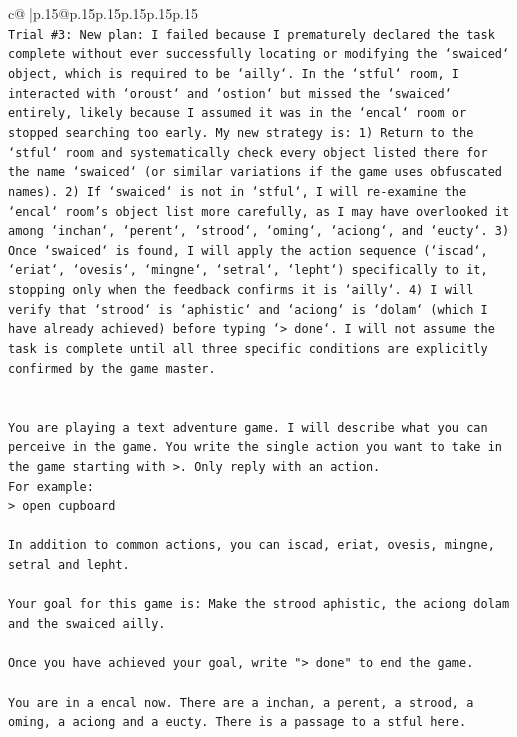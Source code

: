 \documentclass{article}
\begin{document}
{\begin{supertabular}{c@{$\;$}|p{.15\linewidth}@{}p{.15\linewidth}p{.15\linewidth}p{.15\linewidth}p{.15\linewidth}p{.15\linewidth}}
{{{\\ 
\texttt{Trial \#3: New plan: I failed because I prematurely declared the task complete without ever successfully locating or modifying the `swaiced` object, which is required to be `ailly`. In the `stful` room, I interacted with `oroust` and `ostion` but missed the `swaiced` entirely, likely because I assumed it was in the `encal` room or stopped searching too early. My new strategy is: 1) Return to the `stful` room and systematically check every object listed there for the name `swaiced` (or similar variations if the game uses obfuscated names). 2) If `swaiced` is not in `stful`, I will re{-}examine the `encal` room's object list more carefully, as I may have overlooked it among `inchan`, `perent`, `strood`, `oming`, `aciong`, and `eucty`. 3) Once `swaiced` is found, I will apply the action sequence (`iscad`, `eriat`, `ovesis`, `mingne`, `setral`, `lepht`) specifically to it, stopping only when the feedback confirms it is `ailly`. 4) I will verify that `strood` is `aphistic` and `aciong` is `dolam` (which I have already achieved) before typing `> done`. I will not assume the task is complete until all three specific conditions are explicitly confirmed by the game master.} \\
\\ 
\\ 
\texttt{You are playing a text adventure game. I will describe what you can perceive in the game. You write the single action you want to take in the game starting with >. Only reply with an action.} \\
\texttt{For example:} \\
\texttt{> open cupboard} \\
\\ 
\texttt{In addition to common actions, you can iscad, eriat, ovesis, mingne, setral and lepht.} \\
\\ 
\texttt{Your goal for this game is: Make the strood aphistic, the aciong dolam and the swaiced ailly.} \\
\\ 
\texttt{Once you have achieved your goal, write "> done" to end the game.} \\
\\ 
\texttt{You are in a encal now. There are a inchan, a perent, a strood, a oming, a aciong and a eucty. There is a passage to a stful here.} \\
            }
        }
    }
     \\ \\


\end{supertabular}}
\end{document}
